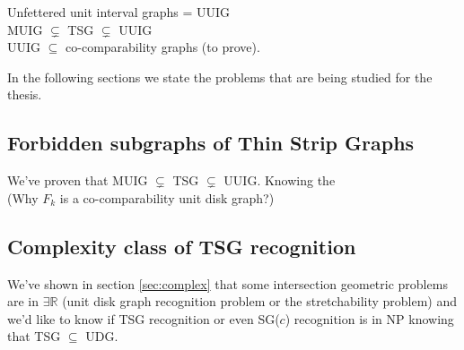 Unfettered unit interval graphs = UUIG\\

MUIG $\subsetneq$ TSG $\subsetneq$ UUIG\\

UUIG $\subseteq$ co-comparability graphs (to prove).

In the following sections we state the problems that are being studied for the thesis.

\subsection{Forbidden subgraphs of Thin Strip Graphs}
  We've proven that MUIG $\subsetneq$ TSG $\subsetneq$ UUIG. Knowing the\\
  (Why $F_k$ is a co-comparability unit disk graph?)

\subsection{Complexity class of TSG recognition}
  We've shown in section \ref{sec:complex} that some intersection geometric
  problems are in $\exists \mathbb{R}$ (unit disk graph recognition problem or
  the stretchability problem) and we'd like to know if
  TSG recognition or even SG($c$) recognition is in NP knowing that TSG
  $\subseteq$ UDG.
